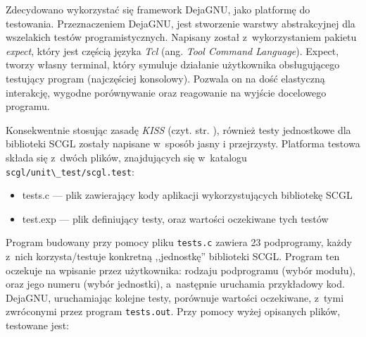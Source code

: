 \documentclass[a4paper,12pt,polish,oneside,openright]{thesis}
\newcommand\code[1]{\lstinline[style=line]{#1}}
\begin{document}
Zdecydowano wykorzystać się framework DejaGNU, jako platformę do testowania.
Przeznaczeniem DejaGNU, jest stworzenie warstwy abstrakcyjnej dla wszelakich testów programistycznych\cite{dejagnu}.
Napisany został z~wykorzystaniem pakietu \emph{expect}, który jest częścią języka \emph{Tcl} (ang. \emph{Tool Command Language}).
Expect, tworzy własny terminal, który symuluje działanie użytkownika obsługującego testujący program (najczęściej konsolowy)\cite{expect}.
Pozwala on na dość elastyczną interakcję, wygodne porównywanie oraz reagowanie na wyjście docelowego programu.

Konsekwentnie stosując zasadę \emph{KISS} (czyt. str. \pageref{kiss}), również testy jednostkowe dla biblioteki SCGL zostały napisane w~sposób jasny i przejrzysty.
Platforma testowa składa się z~dwóch plików, znajdujących się w~katalogu \code{scgl/unit\_test/scgl.test}:
\begin{itemize}
	\item tests.c --- plik zawierający kody aplikacji wykorzystujących bibliotekę SCGL
	\item test.exp --- plik definiujący testy, oraz wartości oczekiwane tych testów
\end{itemize}
Program budowany przy pomocy pliku \code{tests.c} zawiera 23 podprogramy, każdy z~nich korzysta/testuje konkretną ,,jednostkę'' biblioteki SCGL.
Program ten oczekuje na wpisanie przez użytkownika: rodzaju podprogramu (wybór modułu), oraz jego numeru (wybór jednostki), a~następnie uruchamia przykładowy kod.
DejaGNU, uruchamiając kolejne testy, porównuje wartości oczekiwane, z~tymi zwróconymi przez program \code{tests.out}.
Przy pomocy wyżej opisanych plików, testowane jest:
\end{document}
